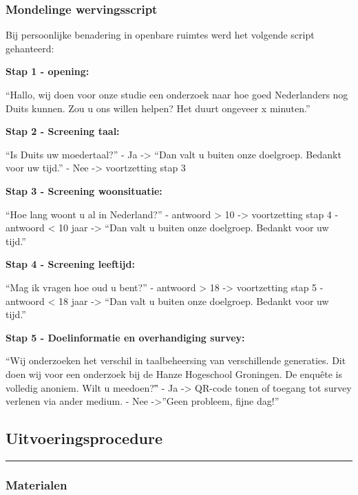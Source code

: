 \documentclass[
]{article}
\begin{document}
\subsubsection{Mondelinge
wervingsscript}\label{mondelinge-wervingsscript}

Bij persoonlijke benadering in openbare ruimtes werd het volgende script
gehanteerd:

\textbf{Stap 1 - opening:}

``Hallo, wij doen voor onze studie een onderzoek naar hoe goed
Nederlanders nog Duits kunnen. Zou u ons willen helpen? Het duurt
ongeveer x minuten.''

\textbf{Stap 2 - Screening taal:}

``Is Duits uw moedertaal?'' - Ja -\textgreater{} ``Dan valt u buiten
onze doelgroep. Bedankt voor uw tijd.'' - Nee -\textgreater{}
voortzetting stap 3

\textbf{Stap 3 - Screening woonsituatie:}

``Hoe lang woont u al in Nederland?'' - antwoord \textgreater{} 10
-\textgreater{} voortzetting stap 4 - antwoord \textless{} 10 jaar
-\textgreater{} ``Dan valt u buiten onze doelgroep. Bedankt voor uw
tijd.''

\textbf{Stap 4 - Screening leeftijd:}

``Mag ik vragen hoe oud u bent?'' - antwoord \textgreater{} 18
-\textgreater{} voortzetting stap 5 - antwoord \textless{} 18 jaar
-\textgreater{} ``Dan valt u buiten onze doelgroep. Bedankt voor uw
tijd.''

\textbf{Stap 5 - Doelinformatie en overhandiging survey:}

``Wij onderzoeken het verschil in taalbeheersing van verschillende
generaties. Dit doen wij voor een onderzoek bij de Hanze Hogeschool
Groningen. De enquête is volledig anoniem. Wilt u meedoen?‟ - Ja
-\textgreater{} QR-code tonen of toegang tot survey verlenen via ander
medium. - Nee -\textgreater{}''Geen probleem, fijne dag!''

\subsection{Uitvoeringsprocedure}\label{uitvoeringsprocedure}

\begin{center}\rule{0.5\linewidth}{0.5pt}\end{center}

\subsubsection{Materialen}\label{materialen}
\end{document}
